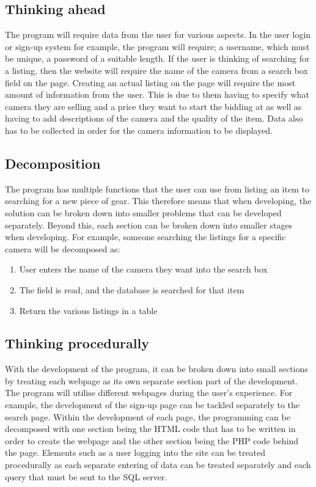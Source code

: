 \subsection{Thinking ahead}
The program will require data from the user for various aspects. In the user login or sign-up system for example, the program will require; a username, which must be unique, a password of a suitable length. If the user is thinking of searching for a listing, then the website will require the name of the camera from a search box field on the page. Creating an actual listing on the page will require the most amount of information from the user. This is due to them having to specify what camera they are selling and a price they want to start the bidding at as well as having to add descriptions of the camera and the quality of the item.  Data also has to be collected in order for the camera information to be displayed. 
\subsection{Decomposition}
The program has multiple functions that the user can use from listing an item to searching for a new piece of gear. This therefore means that when developing, the solution can be broken down into smaller problems that can be developed separately. Beyond this, each section can be broken down into smaller stages when developing. For example, someone searching the listings for a specific camera will be decomposed as: \begin{enumerate}
    \item User enters the name of the camera they want into the search box
    \item The field is read, and the database is searched for that item
    \item Return the various listings in a table 
\end{enumerate}

\subsection{Thinking procedurally}
With the development of the program, it can be broken down into small sections by treating each webpage as its own separate section part of the development. The program will utilise different webpages during the user’s experience. For example, the development of the sign-up page can be tackled separately to the search page. Within the development of each page, the programming can be decomposed with one section being the HTML code that has to be written in order to create the webpage and the other section being the PHP code behind the page. Elements such as a user logging into the site can be treated procedurally as each separate entering of data can be treated separately and each query that must be sent to the SQL server.
